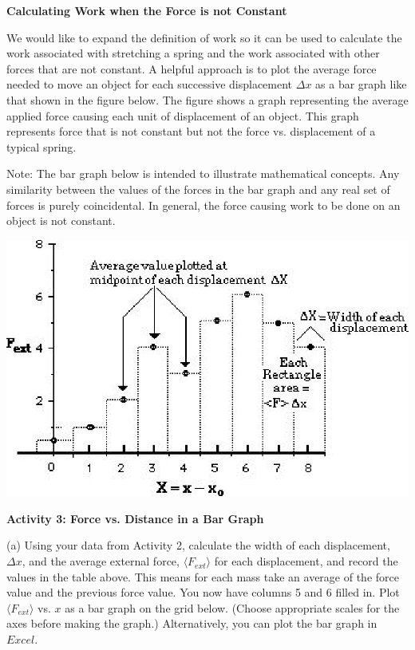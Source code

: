 \textbf{Calculating Work when the Force is not Constant }

We would like to expand the definition of work so it can be used to calculate
the work associated with stretching a spring and the work associated with other
forces that are not constant. A helpful approach is to plot the average force
needed to move an object for each successive displacement \( \Delta  x\) as
a bar graph like that shown in the figure below. The figure shows a graph representing
the average applied force causing each unit of displacement of an object. This
graph represents force that is not constant but not the force vs. displacement
of a typical spring.

Note: The bar graph below is intended to illustrate mathematical concepts. Any
similarity between the values of the forces in the bar graph and any real set
of forces is purely coincidental. In general, the force causing work to be done
on an object is not constant.

\vspace{0.3cm}
{\par\centering \includegraphics{work_kinetic_fig1.eps} \par}
\vspace{0.3cm}

\textbf{Activity 3: Force vs. Distance in a Bar Graph }

(a) Using your data from Activity 2, calculate the width of each displacement, \( \Delta x \), and the average external force, \(\langle F_{ext} \rangle\) for each displacement, and record the values in the table above. This means for each mass take an average of the force value and the previous force value. You now have columns 5 and 6 filled in. Plot \( \langle F_{ext} \rangle\) vs. $x$ as a bar graph on the grid below.  (Choose appropriate scales for the axes before making the graph.) Alternatively, you can plot the bar graph in $Excel$.

